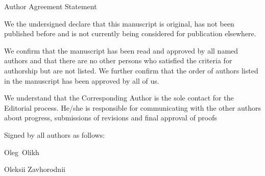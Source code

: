 \documentclass[preprint]{elsarticle}
\begin{document}
Author Agreement Statement
\vspace{10mm}

\noindent
We the undersigned declare that this manuscript is original, has not been published before and is
not currently being considered for publication elsewhere.
\vspace{5mm}

\noindent
We confirm that the manuscript has been read and approved by all named authors and that there
are no other persons who satisfied the criteria for authorship but are not listed. We further
confirm that the order of authors listed in the manuscript has been approved by all of us.
\vspace{5mm}

\noindent
We understand that the Corresponding Author is the sole contact for the Editorial process.
He/she is responsible for communicating with the other authors about progress, submissions of
revisions and final approval of proofs
\vspace{5mm}

\noindent
Signed by all authors as follows:
\vspace{5mm}

\noindent
Oleg~Olikh
\vspace{5mm}

\noindent
Oleksii Zavhorodnii
\vspace{5mm}
\end{document}
